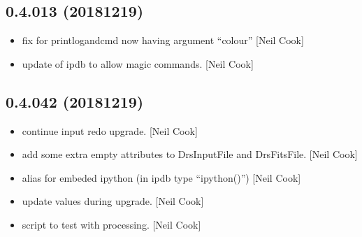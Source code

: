 \documentclass[a4paper,10pt,english]{report}
\begin{document}
\subsection{0.4.013 (2018\sphinxhyphen{}12\sphinxhyphen{}19)}
\label{\detokenize{misc/changelog:id243}}\begin{itemize}
\item {} 
 \sphinxhyphen{} fix for printlogandcmd now having argument “colour”
{[}Neil Cook{]}

\item {} 
 \sphinxhyphen{} update of ipdb to allow magic commands. {[}Neil Cook{]}

\end{itemize}


\subsection{0.4.042 (2018\sphinxhyphen{}12\sphinxhyphen{}19)}
\label{\detokenize{misc/changelog:id244}}\begin{itemize}
\item {} 
 \sphinxhyphen{} continue input redo upgrade. {[}Neil Cook{]}

\item {} 
 \sphinxhyphen{} add some extra empty attributes to DrsInputFile and
DrsFitsFile. {[}Neil Cook{]}

\item {} 
 \sphinxhyphen{} alias for embeded ipython (in ipdb type “ipython()”)
{[}Neil Cook{]}

\item {} 
 \sphinxhyphen{} update values during  upgrade. {[}Neil
Cook{]}

\item {} 
 \sphinxhyphen{} script to test  with processing. {[}Neil
Cook{]}

\end{itemize}
\end{document}

